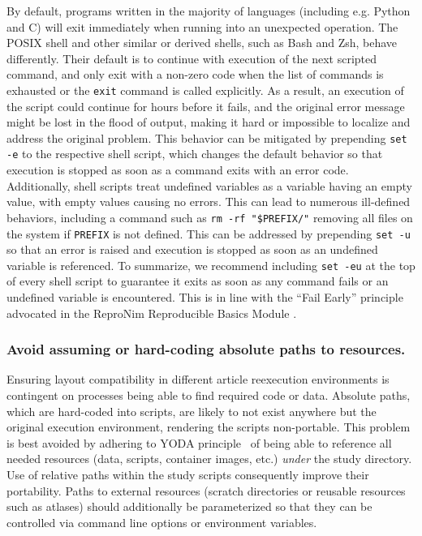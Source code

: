By default, programs written in the majority of languages (including e.g. Python and C) will exit immediately when running into an unexpected operation.
The POSIX shell and other similar or derived shells, such as Bash and Zsh, behave differently.
Their default is to continue with execution of the next scripted command, and only exit with a non-zero code when the list of commands is exhausted or the \texttt{exit} command is called explicitly.
As a result, an execution of the script could continue for hours before it fails, and the original error message might be lost in the flood of output, making it hard or impossible to localize and address the original problem.
This behavior can be mitigated by prepending \texttt{set -e} to the respective shell script, which changes the default behavior so that execution is stopped as soon as a command exits with an error code.
Additionally, shell scripts treat undefined variables as a variable having an empty value, with empty values causing no errors.
This can lead to numerous ill-defined behaviors, including a command such as \texttt{rm -rf "\${PREFIX}/"} removing all files on the system if \texttt{PREFIX} is not defined.
This can be addressed by prepending \texttt{set -u} so that an error is raised and execution is stopped as soon as an undefined variable is referenced.
To summarize, we recommend including \texttt{set -eu} at the top of every shell script to guarantee it exits as soon as any command fails or an undefined variable is encountered.
This is in line with the “Fail Early” principle advocated in the ReproNim Reproducible Basics Module \cite{repronim:reprobasics}.

\subsubsection{Avoid assuming or hard-coding absolute paths to resources.}
Ensuring layout compatibility in different article reexecution environments is contingent on processes being able to find required code or data.
Absolute paths, which are hard-coded into scripts, are likely to not exist anywhere but the original execution environment, rendering the scripts non-portable.
This problem is best avoided by adhering to YODA principle~\cite{yoda} of being able to reference all needed resources (data, scripts, container images, etc.) \emph{under} the study directory.
Use of relative paths within the study scripts consequently improve their portability.
Paths to external resources (scratch directories or reusable resources such as atlases) should additionally be parameterized so that they can be controlled via command line options or environment variables.

